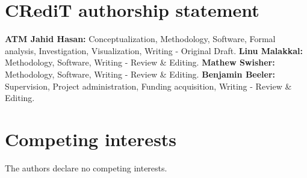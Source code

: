 \documentclass[review]{elsarticle}
\begin{document}
\section{CRediT authorship statement}

\textbf{ATM Jahid Hasan:} Conceptualization, Methodology, Software, Formal analysis, Investigation, Visualization, Writing - Original Draft.
\textbf{Linu Malakkal:} Methodology, Software, Writing - Review \& Editing.
\textbf{Mathew Swisher:} Methodology, Software, Writing - Review \& Editing.
\textbf{Benjamin Beeler:} Supervision, Project administration, Funding acquisition, Writing - Review \& Editing.


\section{Competing interests}

The authors declare no competing interests.




\end{document}
